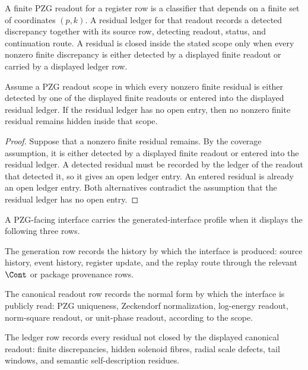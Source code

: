 \begin{definition}
\label{def:rh-pzg-finite-readout-residual-ledger}
A finite PZG readout for a register row is a classifier that depends on a
finite set of coordinates $(p,k)$.  A residual ledger for that readout records
a detected discrepancy together with its source row, detecting readout,
status, and continuation route.  A residual is closed inside the stated scope
only when every nonzero finite discrepancy is either detected by a displayed
finite readout or carried by a displayed ledger row.
\end{definition}

\begin{theorem}
\label{thm:rh-pzg-closed-finite-readout-no-hidden-residual}
Assume a PZG readout scope in which every nonzero finite residual is either
detected by one of the displayed finite readouts or entered into the displayed
residual ledger.  If the residual ledger has no open entry, then no nonzero
finite residual remains hidden inside that scope.
\end{theorem}

\begin{proof}
Suppose that a nonzero finite residual remains.  By the coverage assumption,
it is either detected by a displayed finite readout or entered into the
residual ledger.  A detected residual must be recorded by the ledger of the
readout that detected it, so it gives an open ledger entry.  An entered
residual is already an open ledger entry.  Both alternatives contradict the
assumption that the residual ledger has no open entry.
\end{proof}

\begin{definition}
\label{def:rh-pzg-generated-interface-profile}
A PZG-facing interface carries the generated-interface profile when it
displays the following three rows.

The generation row records the history by which the interface is produced:
source history, event history, register update, and the replay route through
the relevant $\Cont$ or package provenance rows.

The canonical readout row records the normal form by which the interface is
publicly read: PZG uniqueness, Zeckendorf normalization, log-energy readout,
norm-square readout, or unit-phase readout, according to the scope.

The ledger row records every residual not closed by the displayed canonical
readout: finite discrepancies, hidden solenoid fibres, radial scale defects,
tail windows, and semantic self-description residues.
\end{definition}


